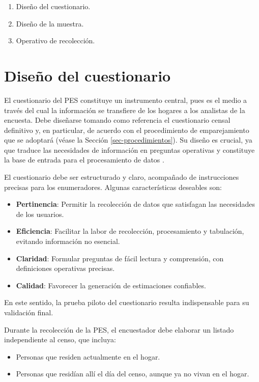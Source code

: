 \documentclass[
  12pt,
]{book}
\providecommand{\tightlist}{%
  \setlength{\itemsep}{0pt}\setlength{\parskip}{0pt}}
\begin{document}
\begin{enumerate}
\def\labelenumi{\arabic{enumi}.}
\tightlist
\item
  Diseño del cuestionario.
\item
  Diseño de la muestra.
\item
  Operativo de recolección.
\end{enumerate}

\section{Diseño del cuestionario}\label{diseuxf1o-del-cuestionario}

El cuestionario del PES constituye un instrumento central, pues es el medio a través del cual la información se transfiere de los hogares a los analistas de la encuesta. Debe diseñarse tomando como referencia el cuestionario censal definitivo y, en particular, de acuerdo con el procedimiento de emparejamiento que se adoptará (véase la Sección \ref{sec-procedimientos}). Su diseño es crucial, ya que traduce las necesidades de información en preguntas operativas y constituye la base de entrada para el procesamiento de datos \citep{UnitedNations_2010, baffour2013modern}.

El cuestionario debe ser estructurado y claro, acompañado de instrucciones precisas para los enumeradores. Algunas características deseables son:

\begin{itemize}
\tightlist
\item
  \textbf{Pertinencia}: Permitir la recolección de datos que satisfagan las necesidades de los usuarios.
\item
  \textbf{Eficiencia}: Facilitar la labor de recolección, procesamiento y tabulación, evitando información no esencial.
\item
  \textbf{Claridad}: Formular preguntas de fácil lectura y comprensión, con definiciones operativas precisas.
\item
  \textbf{Calidad}: Favorecer la generación de estimaciones confiables.
\end{itemize}

En este sentido, la prueba piloto del cuestionario resulta indispensable para su validación final.

Durante la recolección de la PES, el encuestador debe elaborar un listado independiente al censo, que incluya:

\begin{itemize}
\tightlist
\item
  Personas que residen actualmente en el hogar.
\item
  Personas que residían allí el día del censo, aunque ya no vivan en el hogar.
\end{itemize}
\end{document}
